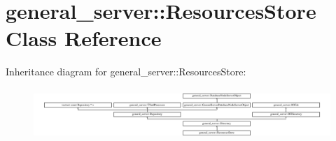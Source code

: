 \hypertarget{classgeneral__server_1_1ResourcesStore}{\section{general\-\_\-server\-:\-:\-Resources\-Store \-Class \-Reference}
\label{classgeneral__server_1_1ResourcesStore}
}
\-Inheritance diagram for general\-\_\-server\-:\-:\-Resources\-Store\-:\begin{figure}[H]
\begin{center}
\leavevmode
\includegraphics[height=1.966292cm]{classgeneral__server_1_1ResourcesStore}
\end{center}
\end{figure}
